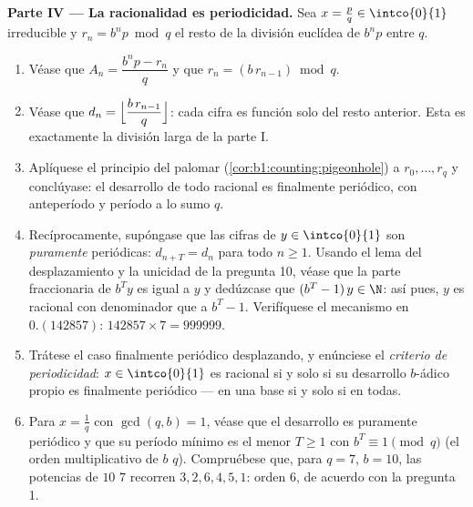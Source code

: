 \begin{problem}
\medskip
\noindent\textbf{Parte IV --- La racionalidad es periodicidad.} Sea
$x = \frac pq \in \intco{0}{1}$ irreducible y $r_n = b^n p \bmod q$ el
resto de la división euclídea de $b^n p$ entre $q$.
\begin{enumerate}[resume]
  \item Véase que $A_n = \dfrac{b^n p - r_n}{q}$ y que
        $r_n = (b\,r_{n-1}) \bmod q$.
  \item Véase que $d_n = \Bigl\lfloor \dfrac{b\,r_{n-1}}{q}
        \Bigr\rfloor$: cada cifra es función solo del resto anterior.
        Esta es exactamente la división larga de la parte I.
  \item Aplíquese el principio del palomar
        (\cref{cor:b1:counting:pigeonhole}) a $r_0, \dots, r_q$ y
        conclúyase: el desarrollo de todo racional es finalmente
        periódico, con anteperíodo y período a lo sumo $q$.
  \item Recíprocamente, supóngase que las cifras de $y \in \intco{0}{1}$
        son \emph{puramente} periódicas: $d_{n+T} = d_n$ para todo
        $n \geq 1$. Usando el lema del desplazamiento y la unicidad de
        la pregunta 10, véase que la parte fraccionaria de $b^T y$ es
        igual a $y$ y dedúzcase que $(b^T - 1)\,y \in \N$: así pues,
        $y$ es racional con denominador que  a $b^T - 1$.
        Verifíquese el mecanismo en $0.(142857)$:
        $142857 \times 7 = 999999$.
  \item Trátese el caso finalmente periódico desplazando, y enúnciese
        el \emph{criterio de periodicidad}: $x \in \intco{0}{1}$ es
        racional si y solo si su desarrollo $b$-ádico propio es
        finalmente periódico --- en una base si y solo si en todas.
  \item Para $x = \frac 1q$ con $\gcd(q, b) = 1$, véase que el
        desarrollo es puramente periódico y que su período mínimo es el
        menor $T \geq 1$ con $b^T \equiv 1 \pmod q$ (el orden
        multiplicativo de $b$  $q$). Compruébese que, para
        $q = 7$, $b = 10$, las potencias de $10$  $7$ recorren
        $3, 2, 6, 4, 5, 1$: orden $6$, de acuerdo con la pregunta 1.
\end{enumerate}


\end{problem}
